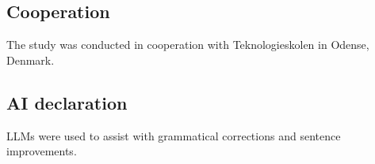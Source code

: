 \subsection{Cooperation}
The study was conducted in cooperation with Teknologieskolen in Odense, Denmark.

\subsection{AI declaration}
LLMs were used to assist with grammatical corrections and sentence improvements.
